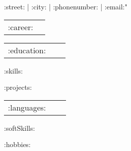 \documentclass[12pt]{article}
\begin{document}

    \begin{center}
    {
        \small\bodyfont
        \faEnvelopeO\/ :street: | \faMapMarker\/ :city: | \faPhone\/ :phonenumber: |\faAt\protect\/ :email:"
    }
    \end{center}


    \setlength{\parskip}{\baselineskip}
    \setlength{\parindent}{2pt}


    \begin{longtable}{p{11em}| p{25em}}
        :career:
    \end{longtable}


    \begin{longtable}{p{11em}| p{25em} c}
        :education:
    \end{longtable}

    :skills:


    :projects:


    \begin{longtable}{p{11em}| p{25em} c}
        :languages:
    \end{longtable}


    :softSkills:


    :hobbies:
\end{document}
